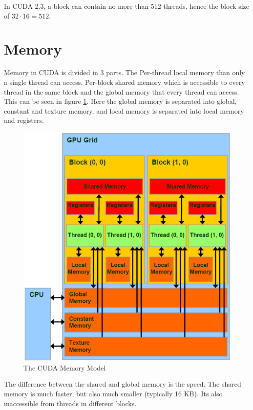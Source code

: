 In CUDA 2.3, a block can contain no more than 512 threads, hence the
block size of $32\cdot 16 = 512$.


\section{Memory}

Memory in CUDA is divided in 3 parts. The Per-thread local memory than
only a single thread can access. Per-block shared memory which is
accessible to every thread in the same block and the global memory
that every thread can access. This can be seen in figure
\ref{fig:cudaMem}. Here the global memory is separated into global,
constant and texture memory, and local memory is separated into local
memory and registers.


\begin{figure}[h]
  \centering
  \includegraphics[width=\textwidth]{imgs/cudaMem}
  \caption{The CUDA Memory Model}
  \label{fig:cudaMem}
\end{figure}

The difference between the shared and global memory is the speed. The
shared memory is much faster, but also much smaller (typically 16
KB). Its also inaccessible from threads in different blocks.

